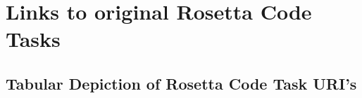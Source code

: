 %
%
%

\chapter{Links to original Rosetta Code Tasks}
\label{cha:links-to-original-rosetta-code-tasks} %

\section*{Tabular Depiction of Rosetta Code Task URI's }
\label{sec:tabular-depiction-rosetta-tasks-uris}

